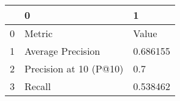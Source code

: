 \begin{tabular}{lll}
\toprule
{} &                       0 &         1 \\
\midrule
0 &                  Metric &     Value \\
1 &       Average Precision &  0.686155 \\
2 &  Precision at 10 (P@10) &       0.7 \\
3 &                  Recall &  0.538462 \\
\bottomrule
\end{tabular}
